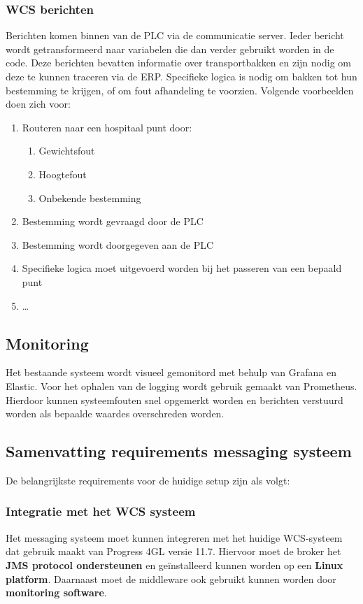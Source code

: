 \subsubsection{WCS berichten} 
Berichten komen binnen van de PLC via de communicatie server. Ieder bericht wordt getransformeerd naar variabelen die dan verder gebruikt worden in de code.
Deze berichten bevatten informatie over transportbakken en zijn nodig om deze te kunnen traceren via de ERP.
Specifieke logica is nodig om bakken tot hun bestemming te krijgen, of om fout afhandeling te voorzien.
Volgende voorbeelden doen zich voor:
\begin{enumerate}
\item Routeren naar een hospitaal punt door: 
\begin{enumerate}
  \item Gewichtsfout
  \item Hoogtefout
  \item Onbekende bestemming
\end{enumerate}
\item Bestemming wordt gevraagd door de PLC
\item Bestemming wordt doorgegeven aan de PLC 
\item Specifieke logica moet uitgevoerd worden bij het passeren van een bepaald punt
\item \dots
\end{enumerate}

\subsection{Monitoring}
Het bestaande systeem wordt visueel gemonitord met behulp van Grafana en Elastic. 
Voor het ophalen van de logging wordt gebruik gemaakt van Prometheus.
Hierdoor kunnen systeemfouten snel opgemerkt worden en berichten verstuurd worden als bepaalde waardes overschreden worden.

\subsection{Samenvatting requirements messaging systeem}
De belangrijkste requirements voor de huidige setup zijn als volgt:

\subsubsection{Integratie met het WCS systeem}
Het messaging systeem moet kunnen integreren met het huidige WCS-systeem dat gebruik maakt van Progress 4GL versie 11.7. 
Hiervoor moet de broker het \textbf{JMS protocol ondersteunen} en geïnstalleerd kunnen worden op een \textbf{Linux platform}.
Daarnaast moet de middleware ook gebruikt kunnen worden door \textbf{monitoring software}.

